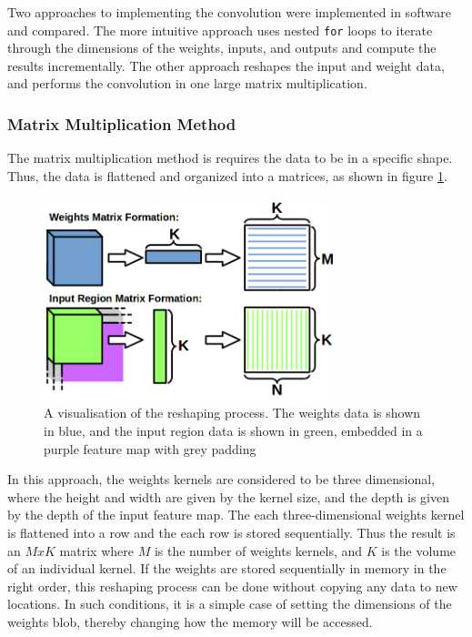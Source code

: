 \documentclass[12pt]{article}
\begin{document}
Two approaches to implementing the convolution were implemented in software and compared. The more intuitive approach uses nested \lstinline|for| loops to iterate through the dimensions of the weights, inputs, and outputs and compute the results incrementally. The other approach reshapes the input and weight data, and performs the convolution in one large matrix multiplication. 

\subsubsection{Matrix Multiplication Method}
\vspace{-12pt}
The matrix multiplication method is requires the data to be in a specific shape. Thus, the data is flattened and organized into a matrices, as shown in figure \ref{fig:im2col}. 

\begin{figure}[h]
\centering
\includegraphics[width=0.75\textwidth]{../figures/im2col.png}
\caption{A visualisation of the reshaping process. The weights data is shown in blue, and the input region data is shown in green, embedded in a purple feature map with grey padding} \label{fig:im2col}
\end{figure}

In this approach, the weights kernels are considered to be three dimensional, where the height and width are given by the kernel size, and the depth is given by the depth of the input feature map. The each three-dimensional weights kernel is flattened into a row and the each row is stored sequentially. Thus the result is an $MxK$ matrix where $M$ is the number of weights kernels, and $K$ is the volume of an individual kernel. If the weights are stored sequentially in memory in the right order, this reshaping process can be done without copying any data to new locations. In such conditions, it is a simple case of setting the dimensions of the weights blob, thereby changing how the memory will be accessed.
\end{document}
